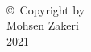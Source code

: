 
\thispagestyle{empty}
\hbox{\ }

\vfill
\renewcommand{\baselinestretch}{1}
\small\normalsize

\vspace{.5in}

\begin{center}
\large{\copyright \hbox{ }Copyright by\\
Mohsen Zakeri  %
\\
2021}
\end{center}

\vfill

\newpage 
